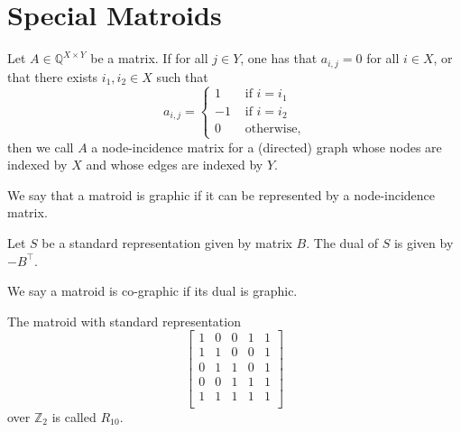 \section{Special Matroids}

\begin{definition}
    \label{Matrix.IsGraphic}
    \leanok
    Let $A \in \mathbb{Q}^{X \times Y}$ be a matrix. If for all $j \in Y$, one has that $a_{i,j} = 0$ for all $i \in X$, or that there exists $i_1,i_2 \in X$ such that
    \[
    a_{i,j} = \begin{cases}
        1 & \text{ if $i = i_1$} \\
        -1 & \text{ if $i = i_2$} \\
        0 & \text{ otherwise},
    \end{cases}
    \]
    then we call $A$ a node-incidence matrix for a (directed) graph whose nodes are indexed by $X$ and whose edges are indexed by $Y$.
\end{definition}

\begin{definition}
    \label{Matroid.IsGraphic}
    \leanok
    We say that a matroid is graphic if it can be represented by a node-incidence matrix.
\end{definition}

\begin{definition}
    \label{StandardRepr.dual}
    \leanok
    Let $S$ be a standard representation given by matrix $B$. The dual of $S$ is given by $-B^\intercal$.
\end{definition}

\begin{definition}
    \label{Matroid.IsCographic}
    \leanok
    We say a matroid is co-graphic if its dual is graphic.
\end{definition}

\begin{definition}
    \label{matroidR10}
    \leanok
    The matroid with standard representation
        \[\begin{bmatrix}
            1 & 0 & 0 & 1 & 1 \\
            1 & 1 & 0 & 0 & 1 \\
            0 & 1 & 1 & 0 & 1 \\
            0 & 0 & 1 & 1 & 1 \\
            1 & 1 & 1 & 1 & 1 \\
        \end{bmatrix}\]
        over $\mathbb{Z}_2$ is called $R_{10}.$
    \end{definition}

